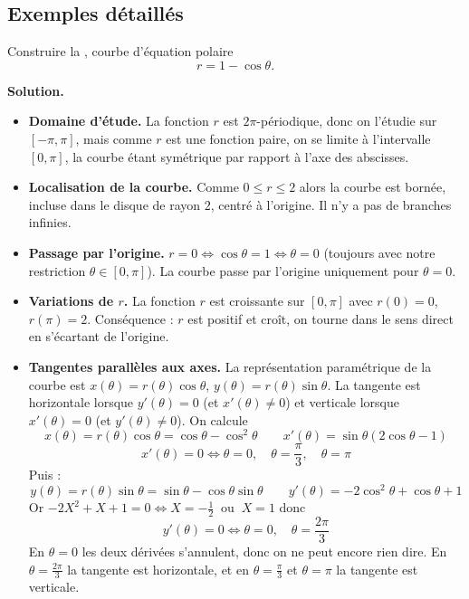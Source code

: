 \documentclass[class=report,crop=false]{standalone}
\begin{document}
\subsection{Exemples détaillés}

\begin{exemple}
Construire la , courbe d'équation polaire
$$r=1-\cos\theta.$$

\medskip
\textbf{Solution.}

\begin{itemize}
  \item \textbf{Domaine d'étude.} La fonction $r$ est $2\pi$-périodique, donc on l'étudie sur $[-\pi,\pi]$,
  mais comme $r$ est une fonction paire, on se limite à l'intervalle $[0,\pi]$, la courbe étant symétrique par
  rapport à l'axe des abscisses.

    \item \textbf{Localisation de la courbe.} Comme $0 \le r \le 2$ alors la courbe est bornée,
    incluse dans le disque de rayon $2$, centré à l'origine. Il n'y a pas de branches infinies.

  \item \textbf{Passage par l'origine.} $r=0 \iff \cos \theta  = 1 \iff \theta = 0$ (toujours avec
  notre restriction $\theta \in [0,\pi]$). La courbe passe par l'origine uniquement pour $\theta = 0$.

  \item \textbf{Variations de $r$.} La fonction $r$ est croissante sur $[0,\pi]$ avec
  $r(0)=0$, $r(\pi) = 2$. Conséquence : $r$ est positif et croît, on tourne dans
  le sens direct en s'écartant de l'origine.

  \item \textbf{Tangentes parallèles aux axes.}
  La représentation paramétrique de la courbe est $x(\theta) = r(\theta) \cos \theta$,
  $y(\theta) = r(\theta) \sin \theta$. La tangente est horizontale
  lorsque $y'(\theta)=0$ (et $x'(\theta)\neq 0$) et verticale lorsque $x'(\theta)=0$
  (et $y'(\theta)\neq0$).
  On calcule
  $$x(\theta) = r(\theta) \cos \theta = \cos \theta - \cos^2\theta \qquad
  x'(\theta) = \sin\theta ( 2\cos\theta -1)$$
  $$x'(\theta) = 0 \iff \theta = 0, \quad \theta = \frac\pi3, \quad \theta = \pi$$
  Puis :
  $$y(\theta) = r(\theta) \sin \theta = \sin \theta - \cos\theta \sin\theta \qquad
  y'(\theta) = -2\cos^2\theta+\cos\theta+1$$
  Or $-2X^2+X+1=0 \iff X=-\frac12 \ \text{ ou } \  X = 1$ donc 
  $$y'(\theta) = 0 \iff \theta = 0, \quad \theta = \frac{2\pi}{3}$$
  En $\theta=0$ les deux dérivées s'annulent, donc on ne peut encore rien dire.
  En $\theta = \frac{2\pi}{3}$ la tangente est horizontale,
  et en $\theta = \frac\pi3$ et $\theta = \pi$ la tangente est verticale.



\end{itemize}
\end{exemple}
\end{document}
